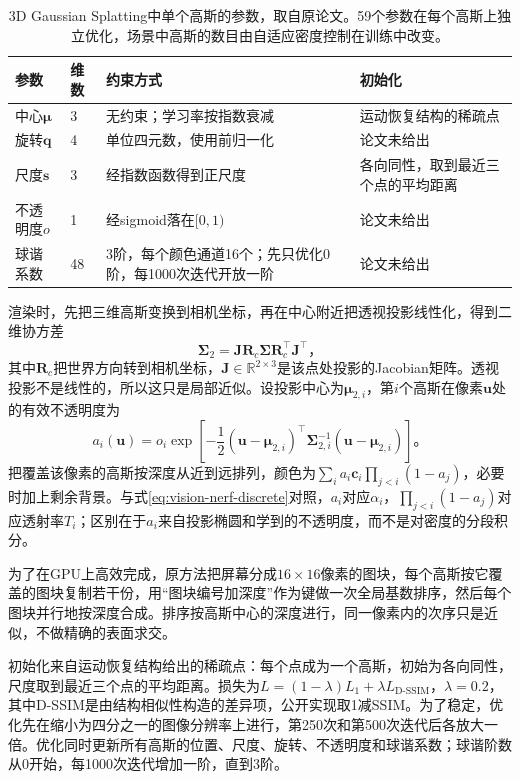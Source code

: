 \begin{table}[htbp]
 \centering
 \small
 \begin{tabularx}{\linewidth}{@{}p{20mm}p{9mm}XX@{}}
  \toprule
  参数 & 维数 & 约束方式 & 初始化\\
  \midrule
  中心$\bm{\mu}$ & 3 & 无约束；学习率按指数衰减 & 运动恢复结构的稀疏点\\
  旋转$\bm{q}$ & 4 & 单位四元数，使用前归一化 & 论文未给出\\
  尺度$\bm{s}$ & 3 & 经指数函数得到正尺度 & 各向同性，取到最近三个点的平均距离\\
  不透明度$o$ & 1 & 经sigmoid落在$[0,1)$ & 论文未给出\\
  球谐系数 & 48 & 3阶，每个颜色通道16个；先只优化0阶，每1000次迭代开放一阶 & 论文未给出\\
  \bottomrule
 \end{tabularx}
 \caption{3D Gaussian Splatting中单个高斯的参数，取自原论文。59个参数在每个高斯上独立优化，场景中高斯的数目由自适应密度控制在训练中改变。}
 \label{tab:vision-gaussian-parameters}
\end{table}

渲染时，先把三维高斯变换到相机坐标，再在中心附近把透视投影线性化，得到二维协方差
\begin{equation}
 \bm{\Sigma}_{2}
 =\bm{J}\bm{R}_{c}\bm{\Sigma}
    \bm{R}_{c}^{\top}\bm{J}^{\top}\text{，}
 \label{eq:vision-gaussian-projection}
\end{equation}
其中$\bm{R}_{c}$把世界方向转到相机坐标，$\bm{J}\in\mathbb{R}^{2\times3}$是该点处投影的Jacobian矩阵。透视投影不是线性的，所以这只是局部近似。设投影中心为$\bm{\mu}_{2,i}$，第$i$个高斯在像素$\bm{u}$处的有效不透明度为
\begin{equation}
 a_i(\bm{u})=o_i\exp\!\left[
 -\frac12(\bm{u}-\bm{\mu}_{2,i})^\top
 \bm{\Sigma}_{2,i}^{-1}(\bm{u}-\bm{\mu}_{2,i})
 \right]\text{。}
 \label{eq:vision-gaussian-alpha}
\end{equation}
把覆盖该像素的高斯按深度从近到远排列，颜色为$\sum_i a_i\bm{c}_i\prod_{j<i}(1-a_j)$，必要时加上剩余背景。与式\eqref{eq:vision-nerf-discrete}对照，$a_i$对应$\alpha_i$，$\prod_{j<i}(1-a_j)$对应透射率$T_i$；区别在于$a_i$来自投影椭圆和学到的不透明度，而不是对密度的分段积分。

为了在GPU上高效完成，原方法把屏幕分成$16\times16$像素的图块，每个高斯按它覆盖的图块复制若干份，用“图块编号加深度”作为键做一次全局基数排序，然后每个图块并行地按深度合成。排序按高斯中心的深度进行，同一像素内的次序只是近似，不做精确的表面求交。

初始化来自运动恢复结构给出的稀疏点：每个点成为一个高斯，初始为各向同性，尺度取到最近三个点的平均距离。损失为$L=(1-\lambda)L_1+\lambda L_{\text{D-SSIM}}$，$\lambda=0.2$，其中D-SSIM是由结构相似性构造的差异项，公开实现取1减SSIM。为了稳定，优化先在缩小为四分之一的图像分辨率上进行，第250次和第500次迭代后各放大一倍。优化同时更新所有高斯的位置、尺度、旋转、不透明度和球谐系数；球谐阶数从0开始，每1000次迭代增加一阶，直到3阶。

